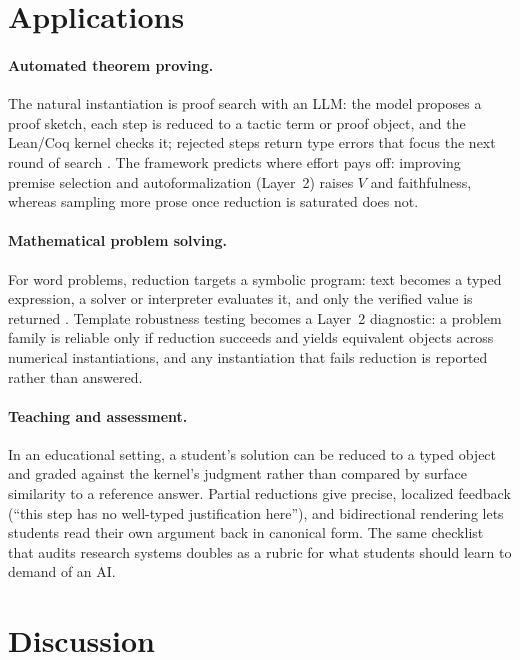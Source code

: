 \documentclass[11pt,a4paper]{article}
\theoremstyle{plain}
\theoremstyle{definition}
\theoremstyle{remark}
\begin{document}
\section{Applications}\label{sec:applications}

\paragraph{Automated theorem proving.}
The natural instantiation is proof search with an LLM: the model proposes
a proof sketch, each step is reduced to a tactic term or proof object, and
the Lean/Coq kernel checks it; rejected steps return type errors that
focus the next round of search \citep{first2023baldur,hubert2025alphaproof}.
The framework predicts where effort pays off: improving premise selection
and autoformalization (Layer~2) raises $V$ and faithfulness, whereas
sampling more prose once reduction is saturated does not.

\paragraph{Mathematical problem solving.}
For word problems, reduction targets a symbolic program: text becomes a
typed expression, a solver or interpreter evaluates it, and only the
verified value is returned \citep{chen2023pot,lample2020symbolic}. Template
robustness testing \citep{mirzadeh2024gsmsymbolic} becomes a Layer~2
diagnostic: a problem family is reliable only if reduction succeeds and
yields equivalent objects across numerical instantiations, and any
instantiation that fails reduction is reported rather than answered.

\paragraph{Teaching and assessment.}
In an educational setting, a student's solution can be reduced to a typed
object and graded against the kernel's judgment rather than compared by
surface similarity to a reference answer. Partial reductions give precise,
localized feedback (``this step has no well-typed justification here''),
and bidirectional rendering lets students read their own argument back in
canonical form. The same checklist that audits research systems doubles as
a rubric for what students should learn to demand of an AI.

\section{Discussion}\label{sec:discussion}
\end{document}
